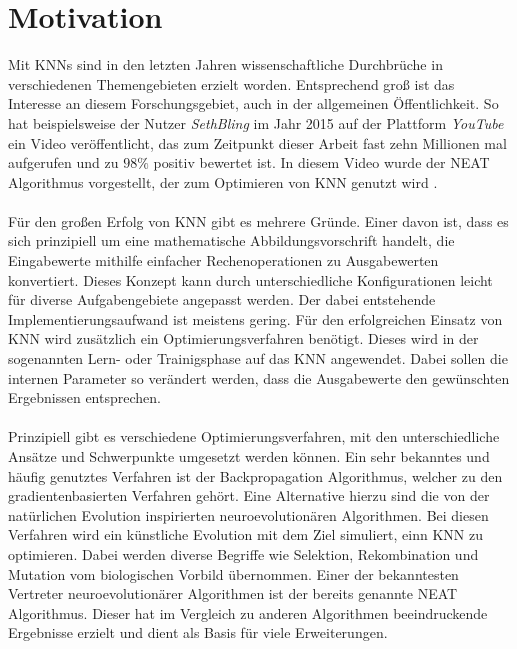 \chapter{Motivation}
Mit \acp{KNN} sind in  den letzten Jahren wissenschaftliche Durchbrüche in verschiedenen Themengebieten erzielt worden. Entsprechend groß ist das Interesse an diesem Forschungsgebiet, auch in der allgemeinen Öffentlichkeit. So hat beispielsweise der Nutzer \emph{SethBling} im Jahr 2015 auf der Plattform \emph{YouTube} ein Video veröffentlicht, das zum Zeitpunkt dieser Arbeit fast zehn Millionen mal aufgerufen und zu $98\%$ positiv bewertet ist. In diesem Video wurde der \ac{NEAT} Algorithmus vorgestellt, der zum Optimieren von \ac{KNN} genutzt wird \cite{bling2015MarIO}.
\\\\
Für den großen Erfolg von \ac{KNN} gibt es mehrere Gründe. Einer davon ist, dass es sich prinzipiell um eine mathematische Abbildungsvorschrift handelt, die Eingabewerte mithilfe einfacher Rechenoperationen zu Ausgabewerten konvertiert. Dieses Konzept kann durch unterschiedliche Konfigurationen leicht für diverse Aufgabengebiete angepasst werden. Der dabei entstehende Implementierungsaufwand ist meistens gering. Für den erfolgreichen Einsatz von \ac{KNN} wird zusätzlich ein Optimierungsverfahren benötigt. Dieses wird in der sogenannten Lern- oder Trainigsphase auf das \ac{KNN} angewendet. Dabei sollen die internen Parameter so verändert werden, dass die Ausgabewerte den gewünschten Ergebnissen entsprechen. 
\\\\
Prinzipiell gibt es verschiedene Optimierungsverfahren, mit den unterschiedliche Ansätze und Schwerpunkte umgesetzt werden können. Ein sehr bekanntes und häufig genutztes Verfahren ist der Backpropagation Algorithmus, welcher zu den gradientenbasierten Verfahren gehört. Eine Alternative hierzu sind die von der natürlichen Evolution inspirierten neuroevolutionären Algorithmen. Bei diesen Verfahren wird ein künstliche Evolution mit dem Ziel simuliert, einn \ac{KNN} zu optimieren. Dabei werden diverse Begriffe wie Selektion, Rekombination und Mutation vom biologischen Vorbild übernommen. Einer der bekanntesten Vertreter neuroevolutionärer Algorithmen ist der bereits genannte \ac{NEAT} Algorithmus. Dieser hat im Vergleich zu anderen Algorithmen beeindruckende Ergebnisse erzielt und dient als Basis für viele Erweiterungen.

